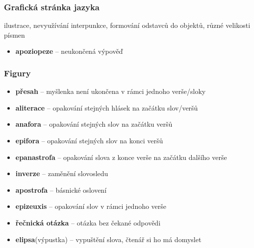 \subsubsection{Grafická stránka jazyka}
ilustrace, nevyužívání interpunkce, formování odstavců do objektů, různé velikosti písmen
\begin{itemize}
\item[] \textbf{apoziopeze} -- neukončená výpověď
\end{itemize}

\subsubsection{Figury}
\begin{itemize}
\item[] \textbf{přesah} -- myšlenka není ukončena v rámci jednoho verše/sloky
\item[] \textbf{aliterace} -- opakování stejných hlásek na začátku slov/veršů
\item[] \textbf{anafora} -- opakování stejných slov na začátku veršů
\item[] \textbf{epifora} -- opakování stejných slov na konci veršů
\item[] \textbf{epanastrofa} -- opakování slova z konce verše na začátku dalšího verše
\item[] \textbf{inverze} -- zaměnění slovosledu
\item[] \textbf{apostrofa} -- básnické oslovení
\item[] \textbf{epizeuxis} -- opakování slov v rámci jednoho verše
\item[] \textbf{řečnická otázka} -- otázka bez čekané odpovědi
\item[] \textbf{elipsa}(výpustka) -- vypuštění slova, čtenář si ho má domyslet
\end{itemize}

